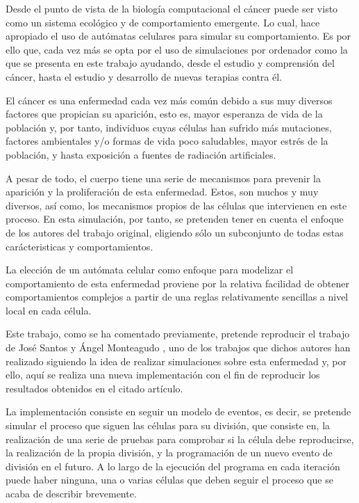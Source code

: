 Desde el punto de vista de la biología computacional el cáncer puede ser visto como un sistema ecológico y de comportamiento emergente.
Lo cual, hace apropiado el uso de autómatas celulares para simular su comportamiento. Es por ello que, cada vez más se opta por el uso
de simulaciones por ordenador como la que se presenta en este trabajo ayudando, desde el estudio y comprensión del cáncer, hasta
el estudio y desarrollo de nuevas terapias contra él.

El cáncer es una enfermedad cada vez más común debido a sus muy diversos factores que propician su aparición, esto es,
mayor esperanza de vida de la población y, por tanto, individuos cuyas células han sufrido más mutaciones, factores ambientales y/o
formas de vida poco saludables, mayor estrés de la población, y hasta exposición a fuentes de radiación artificiales.

A pesar de todo, el cuerpo tiene una serie de mecanismos para prevenir la aparición y la proliferación de esta enfermedad. Estos,
son muchos y muy diversos, así como, los mecanismos propios de las células que intervienen en este proceso. En esta simulación, por tanto,
se pretenden tener en cuenta el enfoque de los autores del trabajo original, eligiendo sólo un subconjunto de todas estas
carácteristicas y comportamientos.

La elección de un autómata celular como enfoque para modelizar el comportamiento de esta enfermedad proviene por la relativa
facilidad de obtener comportamientos complejos a partir de una reglas relativamente sencillas a nivel local en cada célula.

Este trabajo, como se ha comentado previamente, pretende reproducir el trabajo de José Santos y Ángel Monteagudo \cite{jsantos-amonteagudo-1-2014},
uno de los trabajos \cite{jsantos-amonteagudo-2012} \cite{jsantos-amonteagudo-2013} \cite{jsantos-amonteagudo-2015} que dichos autores han realizado siguiendo la idea de realizar simulaciones sobre esta enfermedad y, por ello, aquí
se realiza una nueva implementación con el fin de reproducir los resultados obtenidos en el citado artículo.

La implementación consiste en seguir un modelo de eventos, es decir, se pretende simular el proceso que siguen las células para su división, que
consiste en, la realización de una serie de pruebas para comprobar si la célula debe reproducirse, la realización de la propia división, y
la programación de un nuevo evento de división en el futuro. A lo largo de la ejecución del programa en cada iteración puede haber ninguna, una o
varias células que deben seguir el proceso que se acaba de describir brevemente.

